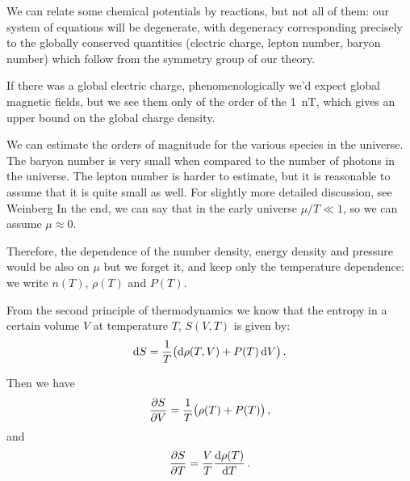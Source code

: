 \documentclass[main.tex]{subfiles}
\begin{document}
%
%



We can relate some chemical potentials by reactions, but not all of them: our system of equations will be degenerate, with degeneracy corresponding precisely to the globally conserved quantities (electric charge, lepton number, baryon number) which follow from the symmetry group of our theory.

If there was a global electric charge, phenomenologically we'd expect global magnetic fields, but we see them only of the order of the \SI{1}{nT}, which gives an upper bound on the global charge density.

We can estimate the orders of magnitude for the various species in the universe.
The baryon number is very small when compared to the number of photons in the universe. The lepton number is harder to estimate, but it is reasonable to assume that it is quite small as well. For slightly more detailed discussion, see Weinberg \cite[before eq. 15.6.5]{weinbergGravitationCosmologyPrinciples1972}
In the end, we can say that in the early universe \(\mu / T \ll 1\), so we can assume \(\mu \approx 0\).

Therefore, the dependence of the number density, energy density and pressure would be also on \(\mu \) but we forget it, and keep only the temperature dependence: we write \(n(T)\), \(\rho (T)\) and \(P(T)\).

From the second principle of thermodynamics we know that the entropy in a certain volume \(V\) at temperature \(T\), \(S(V, T)\) is given by: 
%
\begin{equation}
  \dd{S}  = \frac{1}{T} \qty(\dd{\rho (T, V)}  + P(T) \dd{V} )
\,.
\end{equation}
%
 
Then we have 
%
\begin{equation}
  \pdv{S}{V} = \frac{1}{T} \qty(\rho (T) + P(T))
\,,
\end{equation}
%
and 
%
\begin{equation}
  \pdv{S}{T} = \frac{V}{T} \dv{\rho (T)}{T} 
\,.
\end{equation}
%
\end{document}
